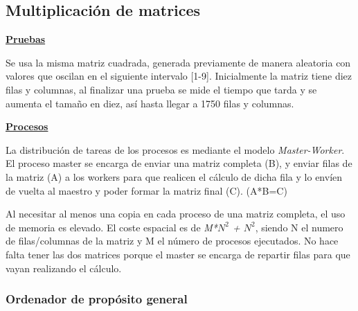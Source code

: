 	\subsection{Multiplicación de matrices}
	
	\begin{flushleft}
	\begin{mdframed}[roundcorner=5pt]	
	
		\textbf{\underline{Pruebas}}
		\vspace{0.1cm}
	
		\scriptsize	
		Se usa la misma matriz cuadrada, generada previamente de manera aleatoria con valores que oscilan en el siguiente intervalo [1-9]. Inicialmente la matriz tiene diez filas y columnas, al finalizar una prueba se mide el tiempo que tarda y se aumenta el tamaño en diez, así hasta llegar a 1750 filas y columnas.\\		
		
	
		\normalsize
		
		\textbf{\underline{Procesos}}
		
		\vspace{0.1cm}
		
		\scriptsize	
		La distribución de tareas de los procesos es mediante el modelo \textit{Master-Worker}. El proceso master se encarga de enviar una matriz completa (B), y enviar filas de la matriz (A) a los workers para que realicen el cálculo de dicha fila y lo envíen de vuelta al maestro y poder formar la matriz final (C). (A*B=C)
	
	\end{mdframed}
	\end{flushleft}		
	
		Al necesitar al menos una copia en cada proceso de una matriz completa, el uso de memoria es elevado. El  coste espacial es de \textit{M*\(N^{2}\) + \(N^{2}\)}, siendo N el numero de filas/columnas de la matriz y M el número de procesos ejecutados. No hace falta tener las dos matrices porque el master se encarga de repartir filas para que vayan realizando el cálculo.
		
		
	
		\subsubsection{Ordenador de propósito general}
		
